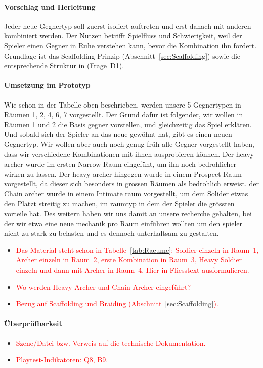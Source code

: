 \documentclass[../Main.tex]{subfiles}
\begin{document}
\paragraph{Vorschlag und Herleitung}
Jeder neue Gegnertyp soll zuerst isoliert auftreten und erst danach mit anderen kombiniert werden. Der Nutzen betrifft Spielfluss und Schwierigkeit, weil der Spieler einen Gegner in Ruhe verstehen kann, bevor die Kombination ihn fordert. Grundlage ist das Scaffolding-Prinzip (Abschnitt~\ref{sec:Scaffolding}) sowie die entsprechende Struktur in  (Frage~D1).

\paragraph{Umsetzung im Prototyp}
Wie schon in der Tabelle oben beschrieben, werden unsere 5 Gegnertypen in Räumen 1, 2, 4, 6, 7 vorgestellt. Der Grund dafür ist folgender, wir wollen in Räumen 1 und 2 die Basis gegner vorstellen, und gleichzeitig das Spiel erklären. Und sobald sich der Spieler an das neue gewöhnt hat, gibt es einen neuen Gegnertyp. Wir wollen aber auch noch genug früh alle Gegner vorgestellt haben, dass wir verschiedene Kombinationen mit ihnen ausprobieren können. Der heavy archer wurde im ersten Narrow Raum eingefüht, um ihn noch bedrohlicher wirken zu lassen. Der heavy archer hingegen wurde in einem Prospect Raum vorgestellt, da dieser sich besonders in grossen Räumen als bedrohlich erweist. der Chain archer wurde in einem Intimate raum vorgestellt, um dem Solider etwas den Platzt streitig zu machen, im raumtyp in dem der Spieler die grössten vorteile hat.
Des weitern haben wir uns damit an unsere recherche gehalten, bei der wir etwa eine neue mechanik pro Raum einführen wollten um den spieler nicht zu stark zu belasten und es dennoch unterhaltsam zu gestalten.
\begin{itemize}[leftmargin=1.5cm]
    \item \textcolor{red}{Das Material steht schon in Tabelle~\ref{tab:Raeume}: Soldier einzeln in Raum~1, Archer einzeln in Raum~2, erste Kombination in Raum~3, Heavy Soldier einzeln und dann mit Archer in Raum~4. Hier in Fliesstext ausformulieren.}
    \item \textcolor{red}{Wo werden Heavy Archer und Chain Archer eingeführt?}
    \item \textcolor{red}{Bezug auf Scaffolding und Braiding (Abschnitt~\ref{sec:Scaffolding}).}
\end{itemize}

\paragraph{Überprüfbarkeit}
\begin{itemize}[leftmargin=1.5cm]
    \item \textcolor{red}{Szene/Datei bzw. Verweis auf die technische Dokumentation.}
    \item \textcolor{red}{Playtest-Indikatoren: Q8, B9.}
\end{itemize}
\end{document}
